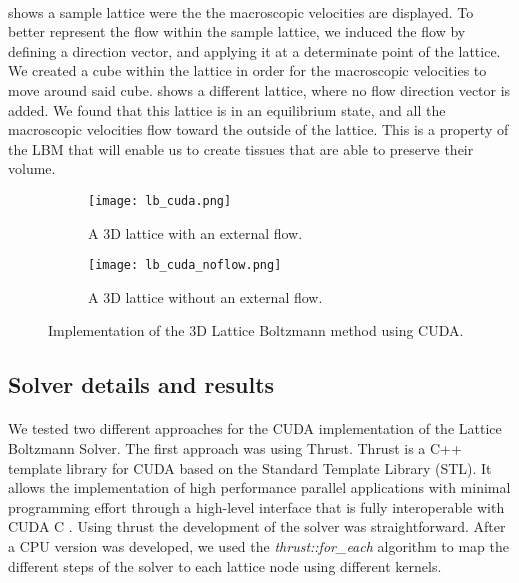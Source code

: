 \paragraph{} shows a sample lattice were the the macroscopic velocities are displayed. To better represent the flow within the sample lattice, we induced the flow by defining a direction vector, and applying it at a determinate point of the lattice. We created a cube within the lattice in order for the macroscopic velocities to move around said cube.  shows a different lattice, where no flow direction vector is added. We found that this lattice is in an equilibrium state, and all the macroscopic velocities flow toward the outside of the lattice. This is a property of the LBM that will enable us to create tissues that are able to preserve their volume.

\begin{figure}[t]
    \centering
    \begin{subfigure}[h]{0.45\textwidth}
        \centering
    		\texttt{[image: lb\_cuda.png]}
    		\caption{A 3D lattice with an external flow.}
    		\label{fig:lb_cuda}
    \end{subfigure}
	\hfill
    \begin{subfigure}[h]{0.45\textwidth}
        \centering
        \texttt{[image: lb\_cuda\_noflow.png]}
        \caption{A 3D lattice without an external flow.}
        \label{fig:lb_cuda_noflow}
    \end{subfigure}

    \caption{Implementation of the 3D Lattice Boltzmann method using CUDA.}
    \label{fig:d3q19}
\end{figure}

\subsection{Solver details and results}

\paragraph{}We tested two different approaches for the CUDA implementation of the Lattice Boltzmann Solver. The first approach was using Thrust. Thrust is a C++ template library for CUDA based on the Standard Template Library (STL). It allows the implementation of high performance parallel applications with minimal programming effort through a high-level interface that is fully interoperable with CUDA C \citep{nvidia2015thrust}. Using thrust the development of the solver was straightforward. After a CPU version was developed, we used the \textit{thrust::for\_each} algorithm to map the different steps of the solver to each lattice node using different kernels.

